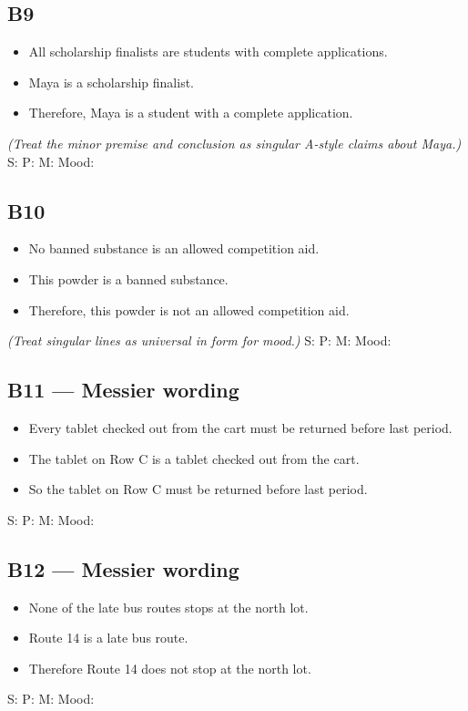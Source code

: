 \documentclass[11pt]{article}
\newcommand{\syllblock}[3]{%
\begin{itemize}[leftmargin=1.2em]
\item #1
\item #2
\item #3
\end{itemize}
}
\begin{document}
\subsection*{B9}
\syllblock
{All scholarship finalists are students with complete applications.}
{Maya is a scholarship finalist.}
{Therefore, Maya is a student with a complete application.}
\textit{(Treat the minor premise and conclusion as singular A-style claims about Maya.)}
S: \underline{\hspace{1.7in}}
P: \underline{\hspace{1.7in}}
M: \underline{\hspace{1.7in}}
Mood: \underline{\hspace{1.0in}}

\subsection*{B10}
\syllblock
{No banned substance is an allowed competition aid.}
{This powder is a banned substance.}
{Therefore, this powder is not an allowed competition aid.}
\textit{(Treat singular lines as universal in form for mood.)}
S: \underline{\hspace{1.7in}}
P: \underline{\hspace{1.7in}}
M: \underline{\hspace{1.7in}}
Mood: \underline{\hspace{1.0in}}

\subsection*{B11 --- Messier wording}
\syllblock
{Every tablet checked out from the cart must be returned before last period.}
{The tablet on Row C is a tablet checked out from the cart.}
{So the tablet on Row C must be returned before last period.}
S: \underline{\hspace{1.7in}}
P: \underline{\hspace{1.7in}}
M: \underline{\hspace{1.7in}}
Mood: \underline{\hspace{1.0in}}

\subsection*{B12 --- Messier wording}
\syllblock
{None of the late bus routes stops at the north lot.}
{Route 14 is a late bus route.}
{Therefore Route 14 does not stop at the north lot.}
S: \underline{\hspace{1.7in}}
P: \underline{\hspace{1.7in}}
M: \underline{\hspace{1.7in}}
Mood: \underline{\hspace{1.0in}}
\end{document}
